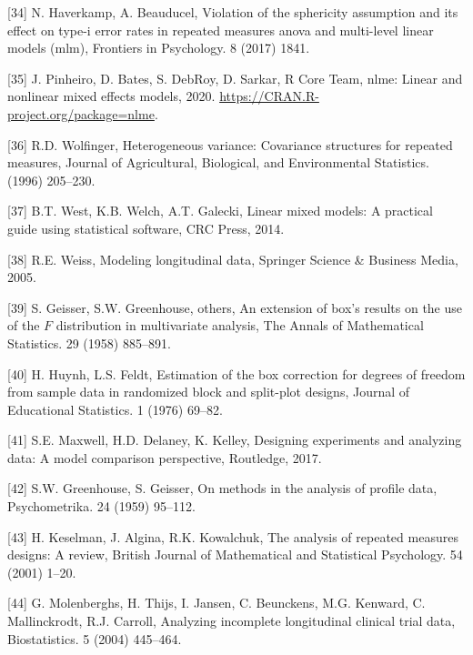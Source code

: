 \documentclass[
]{article}
\begin{document}
\leavevmode\hypertarget{ref-haverkamp2017}{}%
{[}34{]} N. Haverkamp, A. Beauducel, Violation of the sphericity assumption and its effect on type-i error rates in repeated measures anova and multi-level linear models (mlm), Frontiers in Psychology. 8 (2017) 1841.

\leavevmode\hypertarget{ref-nlme}{}%
{[}35{]} J. Pinheiro, D. Bates, S. DebRoy, D. Sarkar, R Core Team, nlme: Linear and nonlinear mixed effects models, 2020. \url{https://CRAN.R-project.org/package=nlme}.

\leavevmode\hypertarget{ref-wolfinger1996}{}%
{[}36{]} R.D. Wolfinger, Heterogeneous variance: Covariance structures for repeated measures, Journal of Agricultural, Biological, and Environmental Statistics. (1996) 205--230.

\leavevmode\hypertarget{ref-west2014}{}%
{[}37{]} B.T. West, K.B. Welch, A.T. Galecki, Linear mixed models: A practical guide using statistical software, CRC Press, 2014.

\leavevmode\hypertarget{ref-weiss2005}{}%
{[}38{]} R.E. Weiss, Modeling longitudinal data, Springer Science \& Business Media, 2005.

\leavevmode\hypertarget{ref-geisser1958}{}%
{[}39{]} S. Geisser, S.W. Greenhouse, others, An extension of box's results on the use of the \(F\) distribution in multivariate analysis, The Annals of Mathematical Statistics. 29 (1958) 885--891.

\leavevmode\hypertarget{ref-huynh1976}{}%
{[}40{]} H. Huynh, L.S. Feldt, Estimation of the box correction for degrees of freedom from sample data in randomized block and split-plot designs, Journal of Educational Statistics. 1 (1976) 69--82.

\leavevmode\hypertarget{ref-maxwell2017}{}%
{[}41{]} S.E. Maxwell, H.D. Delaney, K. Kelley, Designing experiments and analyzing data: A model comparison perspective, Routledge, 2017.

\leavevmode\hypertarget{ref-greenhouse1959}{}%
{[}42{]} S.W. Greenhouse, S. Geisser, On methods in the analysis of profile data, Psychometrika. 24 (1959) 95--112.

\leavevmode\hypertarget{ref-keselman2001}{}%
{[}43{]} H. Keselman, J. Algina, R.K. Kowalchuk, The analysis of repeated measures designs: A review, British Journal of Mathematical and Statistical Psychology. 54 (2001) 1--20.

\leavevmode\hypertarget{ref-molenberghs2004}{}%
{[}44{]} G. Molenberghs, H. Thijs, I. Jansen, C. Beunckens, M.G. Kenward, C. Mallinckrodt, R.J. Carroll, Analyzing incomplete longitudinal clinical trial data, Biostatistics. 5 (2004) 445--464.
\end{document}
